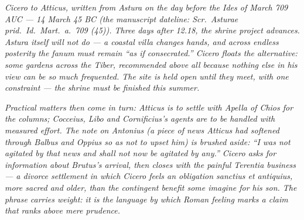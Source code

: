 
\textit{Cicero to Atticus, written from Astura on the
day before the Ides of March 709 AUC --- 14 March 45
BC (the manuscript dateline: \textit{Scr.\ Asturae
prid.\ Id.\ Mart.\ a.\ 709 (45)}). Three days after
12.18, the shrine project advances. Astura itself
will not do --- a coastal villa changes hands, and
across endless posterity the \textit{fanum} must
remain ``as if consecrated.'' Cicero floats the
alternative: some gardens across the Tiber,
recommended above all because nothing else in his
view can be so much frequented. The site is held
open until they meet, with one constraint --- the
shrine must be finished this summer.}

\textit{Practical matters then come in turn:
Atticus is to settle with Apella of Chios for the
columns; Cocceius, Libo and Cornificius's agents are
to be handled with measured effort. The note on
Antonius (a piece of news Atticus had softened
through Balbus and Oppius so as not to upset him) is
brushed aside: ``I was not agitated by that news and
shall not now be agitated by any.'' Cicero asks for
information about Brutus's arrival, then closes with
the painful Terentia business --- a divorce
settlement in which Cicero feels an obligation
\textit{sanctius et antiquius}, more sacred and
older, than the contingent benefit some imagine for
his son. The phrase carries weight: it is the
language by which Roman feeling marks a claim that
ranks above mere prudence.}
